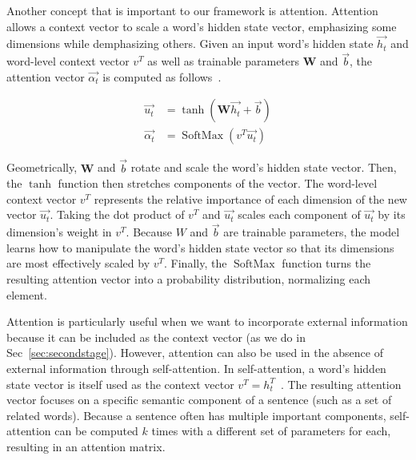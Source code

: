 Another concept that is important to our framework is attention. Attention allows a context vector to scale a word's hidden state vector, emphasizing some dimensions while demphasizing others. 
Given an input word's hidden state $\vec{h_t}$ and word-level context vector $v^{T}$ as well as trainable parameters $\mathbf{W}$ and $\vec{b}$, the attention vector $\vec{\alpha_t}$ is computed as follows~\citep{understandingattention}.

{
    {
        \begin{align*} 
            \vec{u_t} &= \tanh (\mathbf{W} \vec{h_t} + \vec{b}) \\
            \vec{\alpha_t}  &= \operatorname{SoftMax}(v^{T} \vec{u_t})
        \end{align*} 
    } %
}

Geometrically, $\mathbf{W}$ and $\vec{b}$ rotate and scale the  word's hidden state vector. Then, the $\tanh$ function then stretches components of the vector. The word-level context vector $v^{T}$ represents the relative importance of each dimension of the new vector $\vec{u_t}$. Taking the dot product of $v^{T}$ and $\vec{u_t}$ scales each component of $\vec{u_t}$ by its dimension's weight in $v^{T}$. Because $W$ and $\vec{b}$ are trainable parameters, the model learns how to manipulate the word's hidden state vector so that its dimensions are most effectively scaled by $v^{T}$. Finally, the $\operatorname{SoftMax}$ function turns the resulting attention vector into a probability distribution, normalizing each element.

Attention is particularly useful when we want to incorporate external information because it can be included as the context vector (as we do in Sec~\ref{sec:secondstage}). However, attention can also be used in the absence of external information through self-attention. In self-attention, a word's hidden state vector is itself used as the context vector $v^{T} = h_t^{T}$~\citep{selfattentive}. The resulting attention vector focuses on a specific semantic component of a sentence (such as a set of related words). Because a sentence often has multiple important components, self-attention can be computed $k$ times with a different set of parameters for each, resulting in an attention matrix. %

